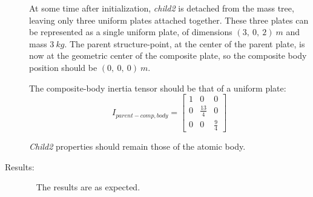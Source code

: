 \begin{description}
At some time after initialization, \textit{child2} is detached from the mass
tree, leaving only three uniform plates attached together. These three plates
can be represented as a single uniform plate, of dimensions $(3,~0,~2)~m$ and
mass $3~kg$.  The parent structure-point, at the center of the parent plate,
is now at the geometric center of the composite plate, so the composite body
position should be $(0,~0,~0)~m$.

The composite-body inertia tensor should be that of a uniform plate:
\begin{equation*}
I_{parent-comp,body} =
   \begin{bmatrix} 1 & 0   & 0  \\
                   0   & \frac{13}{4} & 0   \\
                    0  & 0   & \frac{9}{4}
   \end{bmatrix}
\end{equation*}

\textit{Child2} properties should remain those of the atomic body.

\item[Results:]\ \newline
The results are as expected.


\end{description}

